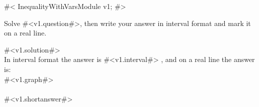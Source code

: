 

#<
InequalityWithVarsModule v1;
#>

Solve #<v1.question#>, then write your answer in interval format and mark it on a real line.

#<v1.solution#> \\
In interval format the answer is #<v1.interval#> , and on a real line the answer is: \\
#<v1.graph#>
\\
\\

#<v1.shortanswer#>



